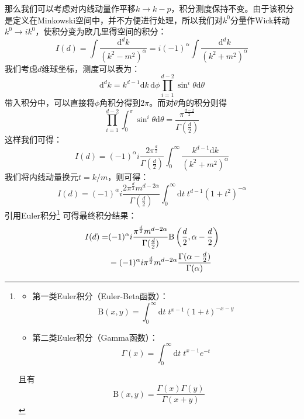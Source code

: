 那么我们可以考虑对内线动量作平移$k\rightarrow k-p$，积分测度保持不变。由于该积分是定义在Minkowski空间中，并不方便进行处理，所以我们对$k^0$分量作Wick转动$k^0\rightarrow ik^0$，使积分变为欧几里得空间的积分：
\begin{equation}
I(d)=\int\frac{\mathrm{d}^d k}{(k^2-m^2)^\alpha}=i(-1)^\alpha\int\frac{\mathrm{d}^d k}{(k^2+m^2)^\alpha}
\label{eq:int1}
\end{equation}
我们考虑$d$维球坐标，测度可以表为：
\begin{equation}
\mathrm{d}^dk=k^{d-1}\mathrm{d}k\,\mathrm{d}\phi\prod_{i=1}^{d-2}\sin^i\theta\mathrm{d}\theta
\end{equation}
带入积分中，可以直接将$\phi$角积分得到$2\pi$。而对$\theta$角的积分则得
\begin{equation}
\prod_{i=1}^{d-2}\int_0^\pi\sin^i\theta\mathrm{d}\theta=\frac{\pi^\frac{d-2}{2}}{\Gamma(\frac{d}{2})}
\end{equation}
这样我们可得：
\begin{equation}
I(d)=(-1)^\alpha i\frac{2\pi^{\frac{d}{2}}}{\Gamma(\frac{d}{2})}\int_0^\infty\frac{k^{d-1}\mathrm{d}k}{(k^2+m^2)^\alpha}
\end{equation}
我们将内线动量换元$t=k/m$，则可得：
\begin{equation}
I(d)=(-1)^\alpha i\frac{2\pi^{\frac{d}{2}}m^{d-2\alpha}}{\Gamma(\frac{d}{2})}\int_0^\infty\mathrm{d}t\; t^{d-1}(1+t^2)^{-\alpha}
\end{equation}
引用Euler积分\footnote{\begin{itemize}
		\item 第一类Euler积分（Euler-Beta函数）：\[\mathrm{B}(x,y)=\int_0^\infty\mathrm{d}t\;t^{x-1}(1+t)^{-x-y}\]
		\item 第二类Euler积分（Gamma函数）：\[\Gamma(x)=\int_0^\infty\mathrm{d}t\;t^{x-1}e^{-t}\]
	\end{itemize}
	且有\vspace{-8pt}\[\mathrm{B}(x,y)=\frac{\Gamma(x)\Gamma(y)}{\Gamma(x+y)}\]}
可得最终积分结果：
\begin{align}
I(d)=&(-1)^\alpha i\frac{\pi^{\frac{d}{2}}m^{d-2\alpha}}{\Gamma(\frac{d}{2})}\mathrm{B}\left(\frac{d}{2},\alpha-\frac{d}{2}\right)\notag\\
&=(-1)^\alpha i\pi^{\frac{d}{2}}m^{d-2\alpha}\frac{\Gamma(\alpha-\frac{d}{2})}{\Gamma(\alpha)}
\label{eq:int1re}
\end{align}

